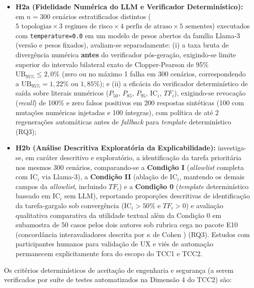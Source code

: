 \documentclass[12pt,openany,oneside,a4paper,english,brazilian,sumario=tradicional]{abntex2}
\newcommand{\IC}{\mathrm{IC}}
\begin{document}
\begin{itemize}
  \item \textbf{H2a (Fidelidade Numérica do LLM e Verificador Determinístico):} em $n=300$ cenários estratificados distintos ($5\text{ topologias} \times 3\text{ regimes de risco} \times 4\text{ perfis de atraso} \times 5\text{ sementes}$) executados com \texttt{temperature=0.0} em um modelo de pesos abertos da família Llama-3 (versão e pesos fixados), avaliam-se separadamente: (i) a taxa bruta de divergência numérica \textbf{antes} do verificador pós-geração, exigindo-se limite superior do intervalo bilateral exato de Clopper-Pearson \cite{clopper1934} de 95\% $\mathrm{UB}_{95\%} \le 2{,}0\%$ (zero ou no máximo 1 falha em 300 cenários, correspondendo a $\mathrm{UB}_{95\%}=1{,}22\%$ ou $1{,}85\%$); e (ii) a eficácia do verificador determinístico de saída sobre literais numéricos ($P_{50}$, $P_{85}$, $P_{95}$, $\IC_i$, $TF_i$), exigindo-se revocação (\textit{recall}) de 100\% e zero falsos positivos em 200 respostas sintéticas (100 com mutações numéricas injetadas e 100 íntegras), com política de até 2 regenerações automáticas antes de \textit{fallback} para \textit{template} determinístico (RQ3);
  \item \textbf{H2b (Análise Descritiva Exploratória da Explicabilidade):} investiga-se, em caráter descritivo e exploratório, a identificação da tarefa prioritária nos mesmos 300 cenários, comparando-se a \textbf{Condição I} (\textit{allowlist} completa com $\IC_i$ via Llama-3), a \textbf{Condição II} (ablação de $\IC_i$, mantendo os demais campos da \textit{allowlist}, incluindo $TF_i$) e a \textbf{Condição 0} (\textit{template} determinístico baseado em $\IC_i$ sem LLM), reportando proporções descritivas de identificação da tarefa-gargalo sob convergência ($\IC_i > 50\%$ e $TF_i > 0$) e avaliação qualitativa comparativa da utilidade textual além da Condição 0 em subamostra de 50 casos pelos dois autores sob rubrica cega no pacote E10 (concordância interavaliadores descrita por $\kappa$ de Cohen \cite{cohen1960}) (RQ3). Estudos com participantes humanos para validação de UX e viés de automação permanecem explicitamente fora do escopo do TCC1 e TCC2.
\end{itemize}

Os critérios determinísticos de aceitação de engenharia e segurança (a serem verificados por suíte de testes automatizados na Dimensão 4 do TCC2) são:
\end{document}
